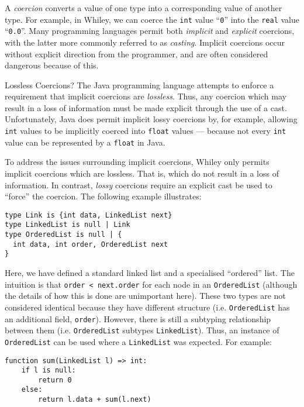 A {\em coercion} converts a value of one type into a corresponding value of another type.  For example, in Whiley, we can coerce the \lstinline{int} value ``\lstinline{0}'' into the \lstinline{real} value ``\lstinline{0.0}''.  Many programming languages permit both {\em implicit} and {\em explicit} coercions, with the latter more commonly referred to as {\em casting}.  Implicit coercions occur without explicit direction from the programmer, and are often considered dangerous because of this.  

\begin{insight}{Lossless Coercions?}
The Java programming language attempts to enforce a requirement that implicit coercions are {\em lossless}.  Thus, any coercion which may result in a loss of information must be made explicit through the use of a cast.  Unfortunately, Java does permit implicit lossy coercions by, for example, allowing \lstinline{int} values to be implicitly coerced into \lstinline{float} values --- because not every \lstinline{int} value can be represented by a \lstinline{float} in Java.
\end{insight}

To address the issues surrounding implicit coercions, Whiley only permits implicit coercions which are lossless.  That is, which do not result in a loss of information.  In contrast, {\em lossy} coercions require an explicit cast be used to ``force'' the coercion.  The following example illustrates:
\begin{lstlisting}
type Link is {int data, LinkedList next}
type LinkedList is null | Link
type OrderedList is null | {
  int data, int order, OrderedList next
}
\end{lstlisting}
Here, we have defined a standard linked list and a specialised
``ordered'' list.  The intuition is that \lstinline{order < next.order} for each node in an \lstinline{OrderedList} (although the details of how this is done are unimportant here).   These two types are not considered identical because they have different structure (i.e. \lstinline{OrderedList} has an additional field, \lstinline{order}).  However, there is still a subtyping relationship between them (i.e. \lstinline{OrderedList} subtypes \lstinline{LinkedList}).  Thus, an instance of \lstinline{OrderedList} can be used where a \lstinline{LinkedList} was expected.  For example:

\begin{lstlisting}
function sum(LinkedList l) => int:
    if l is null:
        return 0
    else:
        return l.data + sum(l.next)
\end{lstlisting}

